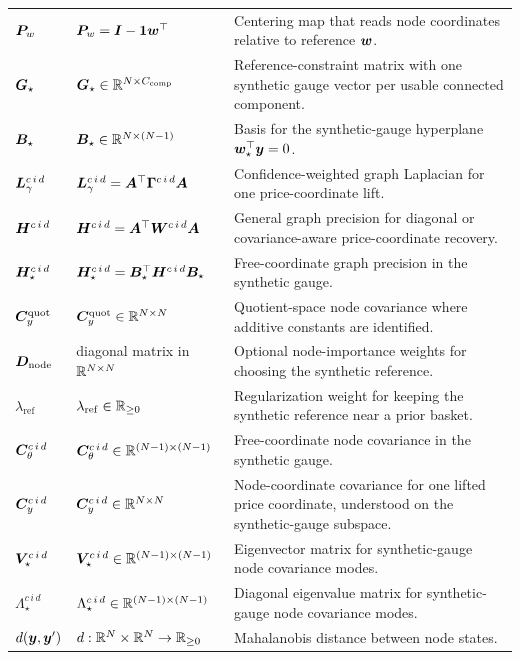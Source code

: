 \begin{center}
\begin{longtable}{>{\raggedright\arraybackslash}p{}
                  >{\raggedright\arraybackslash}p{}
                  >{\raggedright\arraybackslash}p{}}
$\bm{P}_{w}$ & $\bm{P}_{w}=\bm{I}-\mathbf{1}\bm{w}^{\top}$ & Centering map that reads node coordinates relative to reference $\bm{w}$. \\
$\bm{G}_{\star}$ & $\bm{G}_{\star}\in\mathbb{R}^{N\times C_{\mathrm{comp}}}$ & Reference-constraint matrix with one synthetic gauge vector per usable connected component. \\
$\bm{B}_{\star}$ & $\bm{B}_{\star}\in\mathbb{R}^{N\times(N-1)}$ & Basis for the synthetic-gauge hyperplane $\bm{w}_{\star}^{\top}\bm{y}=0$. \\
$\bm{L}_{\gamma}^{c\,i\,d}$ & $\bm{L}_{\gamma}^{c\,i\,d}=\bm{A}^{\top}\bm{\Gamma}^{c\,i\,d}\bm{A}$ & Confidence-weighted graph Laplacian for one price-coordinate lift. \\
$\bm{H}^{c\,i\,d}$ & $\bm{H}^{c\,i\,d}=\bm{A}^{\top}\bm{W}^{c\,i\,d}\bm{A}$ & General graph precision for diagonal or covariance-aware price-coordinate recovery. \\
$\bm{H}_{\star}^{c\,i\,d}$ & $\bm{H}_{\star}^{c\,i\,d}=\bm{B}_{\star}^{\top}\bm{H}^{c\,i\,d}\bm{B}_{\star}$ & Free-coordinate graph precision in the synthetic gauge. \\
$\bm{C}_{y}^{\mathrm{quot}}$ & $\bm{C}_{y}^{\mathrm{quot}}\in\mathbb{R}^{N\times N}$ & Quotient-space node covariance where additive constants are identified. \\
$\bm{D}_{\mathrm{node}}$ & diagonal matrix in $\mathbb{R}^{N\times N}$ & Optional node-importance weights for choosing the synthetic reference. \\
$\lambda_{\mathrm{ref}}$ & $\lambda_{\mathrm{ref}}\in\mathbb{R}_{\ge 0}$ & Regularization weight for keeping the synthetic reference near a prior basket. \\
$\bm{C}_{\theta}^{c\,i\,d}$ & $\bm{C}_{\theta}^{c\,i\,d}\in\mathbb{R}^{(N-1)\times(N-1)}$ & Free-coordinate node covariance in the synthetic gauge. \\
$\bm{C}_{y}^{c\,i\,d}$ & $\bm{C}_{y}^{c\,i\,d}\in\mathbb{R}^{N\times N}$ & Node-coordinate covariance for one lifted price coordinate, understood on the synthetic-gauge subspace. \\
$\bm{V}_{\star}^{c\,i\,d}$ & $\bm{V}_{\star}^{c\,i\,d}\in\mathbb{R}^{(N-1)\times(N-1)}$ & Eigenvector matrix for synthetic-gauge node covariance modes. \\
$\Lambda_{\star}^{c\,i\,d}$ & $\Lambda_{\star}^{c\,i\,d}\in\mathbb{R}^{(N-1)\times(N-1)}$ & Diagonal eigenvalue matrix for synthetic-gauge node covariance modes. \\
$d(\bm{y},\bm{y}')$ & $d:\mathbb{R}^N\times\mathbb{R}^N\rightarrow\mathbb{R}_{\ge 0}$ & Mahalanobis distance between node states. \\
\bottomrule
\end{longtable}
\end{center}
